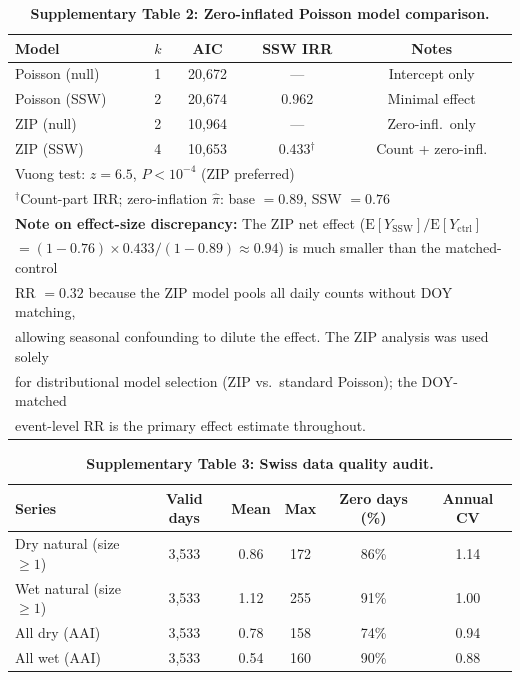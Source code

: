 \documentclass[11pt,letterpaper]{article}
\begin{document}
\begin{table}[!ht]
\centering
\caption{\textbf{Supplementary Table 2: Zero-inflated Poisson model comparison.}}
\label{stab:zip}
\small
\begin{tabular}{lcccc}
\toprule
Model & $k$ & AIC & SSW IRR & Notes \\
\midrule
Poisson (null) & 1 & 20{,}672 & --- & Intercept only \\
Poisson (SSW) & 2 & 20{,}674 & 0.962 & Minimal effect \\
ZIP (null) & 2 & 10{,}964 & --- & Zero-infl.\ only \\
ZIP (SSW) & 4 & 10{,}653 & 0.433$^\dagger$ & Count + zero-infl. \\
\midrule
\multicolumn{5}{l}{Vuong test: $z = 6.5$, $P < 10^{-4}$ (ZIP preferred)} \\
\multicolumn{5}{l}{$^\dagger$Count-part IRR; zero-inflation $\hat{\pi}$: base $= 0.89$, SSW $= 0.76$} \\
\multicolumn{5}{l}{\footnotesize \textbf{Note on effect-size discrepancy:} The ZIP net effect ($\mathrm{E}[Y_\mathrm{SSW}]/\mathrm{E}[Y_\mathrm{ctrl}]$} \\
\multicolumn{5}{l}{\footnotesize $= (1-0.76) \times 0.433 / (1-0.89) \approx 0.94$) is much smaller than the matched-control} \\
\multicolumn{5}{l}{\footnotesize RR $= 0.32$ because the ZIP model pools all daily counts without DOY matching,} \\
\multicolumn{5}{l}{\footnotesize allowing seasonal confounding to dilute the effect. The ZIP analysis was used solely} \\
\multicolumn{5}{l}{\footnotesize for distributional model selection (ZIP vs.\ standard Poisson); the DOY-matched} \\
\multicolumn{5}{l}{\footnotesize event-level RR is the primary effect estimate throughout.} \\
\bottomrule
\end{tabular}
\end{table}

\begin{table}[!ht]
\centering
\caption{\textbf{Supplementary Table 3: Swiss data quality audit.}}
\label{stab:quality}
\small
\begin{tabular}{lccccc}
\toprule
Series & Valid days & Mean & Max & Zero days (\%) & Annual CV \\
\midrule
Dry natural (size $\geq 1$) & 3,533 & 0.86 & 172 & 86\% & 1.14 \\
Wet natural (size $\geq 1$) & 3,533 & 1.12 & 255 & 91\% & 1.00 \\
All dry (AAI) & 3,533 & 0.78 & 158 & 74\% & 0.94 \\
All wet (AAI) & 3,533 & 0.54 & 160 & 90\% & 0.88 \\
\bottomrule
\end{tabular}
\end{table}
\end{document}
